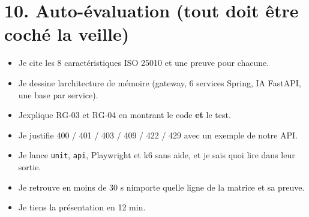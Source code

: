 \documentclass[
  11pt,
]{article}
\providecommand{\tightlist}{%
  \setlength{\itemsep}{0pt}\setlength{\parskip}{0pt}}
\begin{document}
\section{10. Auto-évaluation (tout doit être coché la
veille)}\label{10-auto-uxe9valuation-tout-doit-uxeatre-cochuxe9-la-veille}

\begin{itemize}
\tightlist
\item[$\square$]
  Je cite les 8 caractéristiques ISO 25010 et une preuve pour chacune.
\item[$\square$]
  Je dessine l\textquotesingle architecture de mémoire (gateway, 6
  services Spring, IA FastAPI, une base par service).
\item[$\square$]
  J\textquotesingle explique RG‑03 et RG‑04 en montrant le code
  \textbf{et} le test.
\item[$\square$]
  Je justifie 400 / 401 / 403 / 409 / 422 / 429 avec un exemple de notre
  API.
\item[$\square$]
  Je lance \texttt{unit}, \texttt{api}, Playwright et k6 sans aide, et
  je sais quoi lire dans leur sortie.
\item[$\square$]
  Je retrouve en moins de 30 s n\textquotesingle importe quelle ligne de
  la matrice et sa preuve.
\item[$\square$]
  Je tiens la présentation en 12 min.
\end{itemize}
\end{document}
